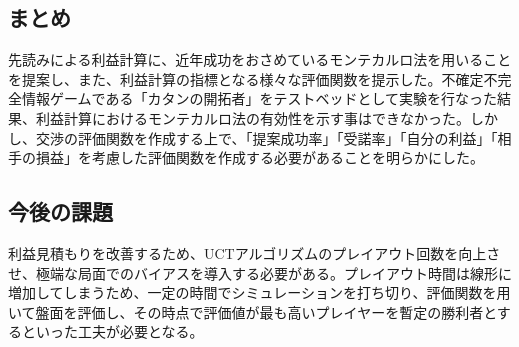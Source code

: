 \documentclass[a4, 10pt,dvipdfmx,twocolumn]{jsarticle}
\begin{document}
\subsection{まとめ}

先読みによる利益計算に、近年成功をおさめているモンテカルロ法を用いることを提案し、また、利益計算の指標となる様々な評価関数を提示した。不確定不完全情報ゲームである「カタンの開拓者」をテストベッドとして実験を行なった結果、利益計算におけるモンテカルロ法の有効性を示す事はできなかった。しかし、交渉の評価関数を作成する上で、「提案成功率」「受諾率」「自分の利益」「相手の損益」を考慮した評価関数を作成する必要があることを明らかにした。

\subsection{今後の課題}
利益見積もりを改善するため、UCTアルゴリズムのプレイアウト回数を向上させ、極端な局面でのバイアスを導入する必要がある。プレイアウト時間は線形に増加してしまうため、一定の時間でシミュレーションを打ち切り、評価関数を用いて盤面を評価し、その時点で評価値が最も高いプレイヤーを暫定の勝利者とするといった工夫が必要となる。





 
\end{document}

